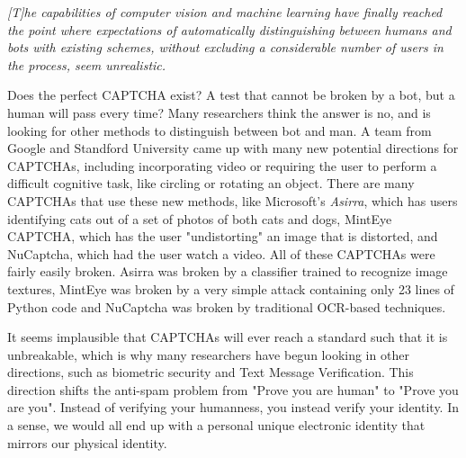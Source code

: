 \documentclass[a4paper]{IEEEtran}
\begin{document}
\begin{displayquote}
\textit{[T]he capabilities of computer vision and machine learning have finally reached the point where expectations of automatically distinguishing between humans and bots with existing
schemes, without excluding a considerable number of users in the process, seem unrealistic.}
\end{displayquote}

Does the perfect CAPTCHA exist? A test that cannot be broken by a bot, but a human will pass every time? Many researchers think the answer is no, and is looking for other methods to distinguish between bot and man. A team from Google and Standford University came up with many new potential directions for CAPTCHAs, including incorporating video or requiring the user to perform a difficult cognitive task, like circling or rotating an object\cite{standford}. There are many CAPTCHAs that use these new methods, like Microsoft's \textit{Asirra}, which has users identifying cats out of a set of photos of both cats and dogs\cite{asirra}, MintEye CAPTCHA, which has the user "undistorting" an image that is distorted, and NuCaptcha, which had the user watch a video. All of these CAPTCHAs were fairly easily broken. Asirra was broken by a classifier trained to recognize image textures\cite{asirrabreak}, MintEye was broken by a very simple attack containing only 23 lines of Python code\cite{minteyebreak} and NuCaptcha was broken by traditional OCR-based techniques\cite{nucaptchabreak}.

It seems implausible that CAPTCHAs will ever reach a standard such that it is unbreakable, which is why many researchers have begun looking in other directions, such as biometric security and Text Message Verification. This direction shifts the anti-spam problem from "Prove you are human" to "Prove you are you". Instead of verifying your humanness, you instead verify your identity. In a sense, we would all end up with a personal unique electronic identity that mirrors our physical identity. 
\end{document}
